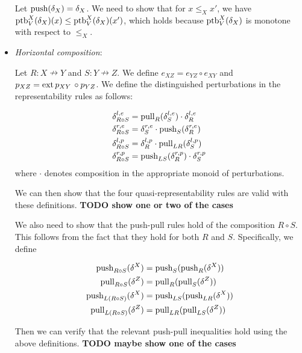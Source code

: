 \begin{itemize}
    Let $\text{push}(\delta_X) = \delta_X$. We need to show that for $x \le_X x'$,
    we have $\text{ptb}_V^X(\delta_X)(x) \le \text{ptb}_V^X(\delta_X)(x')$, which holds because
    $\text{ptb}_V^X(\delta_X)$ is monotone with respect to $\le_X$.


    \item \emph{Horizontal composition}:
    
    Let $R : X \nrightarrow Y$ and $S : Y \nrightarrow Z$.
    We define
    $e_{XZ} = e_{YZ} \circ e_{XY}$ and $p_{XZ} = \text{ext}\,{p_{XY}}\,{} \circ p_{YZ}$.
    We define the distinguished perturbations in the representability rules as follows:

    \begin{align*}
        \delta_{R\circ S}^{l,e} &= \text{pull}_R(\delta_S^{l,e}) \cdot \delta_R^{l,e} \\
        \delta_{R\circ S}^{r,e} &= \delta_S^{r,e} \cdot \text{push}_S(\delta_R^{r,e}) \\
        \delta_{R\circ S}^{l,p} &= \delta_R^{l,p} \cdot \text{pull}_{LR}(\delta_S^{l,p}) \\
        \delta_{R\circ S}^{r,p} &= \text{push}_{LS}(\delta_R^{r,p}) \cdot \delta_S^{r,p}
    \end{align*}
    where $\cdot$ denotes composition in the appropriate monoid of perturbations.

    We can then show that the four quasi-representability rules are valid with these definitions.
    \textbf{TODO show one or two of the cases}

    \vspace{3ex}

    We also need to show that the push-pull rules hold of the composition $R \circ S$.
    This follows from the fact that they hold for both $R$ and $S$.
    Specifically, we define

    \begin{align*}
        \text{push}_{R \circ S}(\delta^X) &= \text{push}_S(\text{push}_R(\delta^X)) \\
        \text{pull}_{R \circ S}(\delta^Z) &= \text{pull}_R(\text{pull}_S(\delta^Z)) \\
        \text{push}_{L(R \circ S)}(\delta^X) &= \text{push}_{LS}(\text{push}_{LR}(\delta^X)) \\
        \text{pull}_{L(R \circ S)}(\delta^Z) &= \text{pull}_{LR}(\text{pull}_{LS}(\delta^Z))
    \end{align*}

    Then we can verify that the relevant push-pull inequalities hold using the above definitions.
    \textbf{TODO maybe show one of the cases}


\end{itemize}
